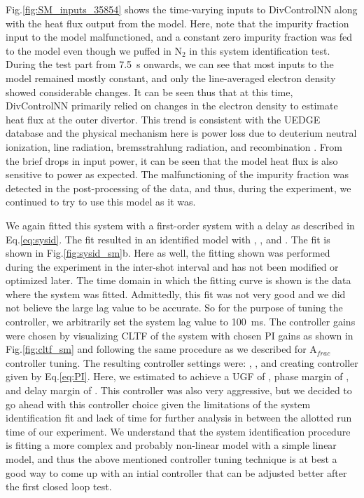 \documentclass[10pt]{iopart}
\newcommand{\Afrac}{A$_{frac}$}
\begin{document}
Fig.\ref{fig:SM_inputs_35854} shows the time-varying inputs to DivControlNN along with the heat flux output from the model.
Here, note that the impurity fraction input to the model malfunctioned, and a constant zero impurity fraction was fed to the model even though we puffed in N$_2$ in this system identification test. During the test part from 7.5~s onwards, we can see that most inputs to the model remained mostly constant, and only the line-averaged electron density showed considerable changes.
It can be seen thus that at this time, DivControlNN primarily relied on changes in the electron density to estimate heat flux at the outer divertor.
This trend is consistent with the UEDGE database and the physical mechanism here is power loss due to deuterium neutral ionization, line radiation, bremsstrahlung radiation, and recombination \cite{zhao_2026_nf}.
From the brief drops in input power, it can be seen that the model heat flux is also sensitive to power as expected.
The malfunctioning of the impurity fraction was detected in the post-processing of the data, and thus, during the experiment, we continued to try to use this model as it was.

We again fitted this system with a first-order system with a delay as described in Eq.\ref{eq:sysid}.
The fit resulted in an identified model with \SMK, \SMTau, and \SML.
The fit is shown in Fig.\ref{fig:sysid_sm}b.
Here as well, the fitting shown was performed during the experiment in the inter-shot interval and has not been modified or optimized later.
The time domain in which the fitting curve is shown is the data where the system was fitted.
Admittedly, this fit was not very good and we did not believe the large lag value to be accurate.
So for the purpose of tuning the controller, we arbitrarily set the system lag value to 100~ms.
The controller gains were chosen by visualizing \ac{CLTF} of the system with chosen PI gains as shown in Fig.\ref{fig:cltf_sm} and following the same procedure as we described for \Afrac{} controller tuning.
The resulting controller settings were: \SMKp, \SMTi, and \SMstau{} creating controller given by Eq.\ref{eq:PI}.
Here, we estimated to achieve a \ac{UGF} of \SMUGF, phase margin of \SMPhaseMargin, and delay margin of \SMDelayMargin.
This controller was also very aggressive, but we decided to go ahead with this controller choice given the limitations of the system identification fit and lack of time for further analysis in between the allotted run time of our experiment.
We understand that the system identification procedure is fitting a more complex and probably non-linear model with a simple linear model, and thus the above mentioned controller tuning technique is at best a good way to come up with an intial controller that can be adjusted better after the first closed loop test.
\end{document}
